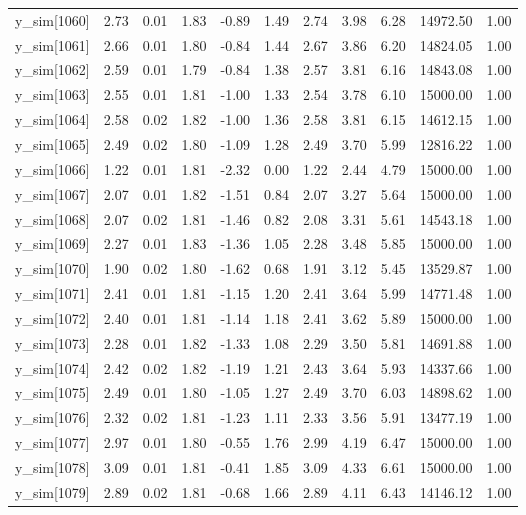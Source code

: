 \begin{table}[ht]
\begin{tabular}{rrrrrrrrrrr}
  y\_sim[1060] & 2.73 & 0.01 & 1.83 & -0.89 & 1.49 & 2.74 & 3.98 & 6.28 & 14972.50 & 1.00 \\ 
  y\_sim[1061] & 2.66 & 0.01 & 1.80 & -0.84 & 1.44 & 2.67 & 3.86 & 6.20 & 14824.05 & 1.00 \\ 
  y\_sim[1062] & 2.59 & 0.01 & 1.79 & -0.84 & 1.38 & 2.57 & 3.81 & 6.16 & 14843.08 & 1.00 \\ 
  y\_sim[1063] & 2.55 & 0.01 & 1.81 & -1.00 & 1.33 & 2.54 & 3.78 & 6.10 & 15000.00 & 1.00 \\ 
  y\_sim[1064] & 2.58 & 0.02 & 1.82 & -1.00 & 1.36 & 2.58 & 3.81 & 6.15 & 14612.15 & 1.00 \\ 
  y\_sim[1065] & 2.49 & 0.02 & 1.80 & -1.09 & 1.28 & 2.49 & 3.70 & 5.99 & 12816.22 & 1.00 \\ 
  y\_sim[1066] & 1.22 & 0.01 & 1.81 & -2.32 & 0.00 & 1.22 & 2.44 & 4.79 & 15000.00 & 1.00 \\ 
  y\_sim[1067] & 2.07 & 0.01 & 1.82 & -1.51 & 0.84 & 2.07 & 3.27 & 5.64 & 15000.00 & 1.00 \\ 
  y\_sim[1068] & 2.07 & 0.02 & 1.81 & -1.46 & 0.82 & 2.08 & 3.31 & 5.61 & 14543.18 & 1.00 \\ 
  y\_sim[1069] & 2.27 & 0.01 & 1.83 & -1.36 & 1.05 & 2.28 & 3.48 & 5.85 & 15000.00 & 1.00 \\ 
  y\_sim[1070] & 1.90 & 0.02 & 1.80 & -1.62 & 0.68 & 1.91 & 3.12 & 5.45 & 13529.87 & 1.00 \\ 
  y\_sim[1071] & 2.41 & 0.01 & 1.81 & -1.15 & 1.20 & 2.41 & 3.64 & 5.99 & 14771.48 & 1.00 \\ 
  y\_sim[1072] & 2.40 & 0.01 & 1.81 & -1.14 & 1.18 & 2.41 & 3.62 & 5.89 & 15000.00 & 1.00 \\ 
  y\_sim[1073] & 2.28 & 0.01 & 1.82 & -1.33 & 1.08 & 2.29 & 3.50 & 5.81 & 14691.88 & 1.00 \\ 
  y\_sim[1074] & 2.42 & 0.02 & 1.82 & -1.19 & 1.21 & 2.43 & 3.64 & 5.93 & 14337.66 & 1.00 \\ 
  y\_sim[1075] & 2.49 & 0.01 & 1.80 & -1.05 & 1.27 & 2.49 & 3.70 & 6.03 & 14898.62 & 1.00 \\ 
  y\_sim[1076] & 2.32 & 0.02 & 1.81 & -1.23 & 1.11 & 2.33 & 3.56 & 5.91 & 13477.19 & 1.00 \\ 
  y\_sim[1077] & 2.97 & 0.01 & 1.80 & -0.55 & 1.76 & 2.99 & 4.19 & 6.47 & 15000.00 & 1.00 \\ 
  y\_sim[1078] & 3.09 & 0.01 & 1.81 & -0.41 & 1.85 & 3.09 & 4.33 & 6.61 & 15000.00 & 1.00 \\ 
  y\_sim[1079] & 2.89 & 0.02 & 1.81 & -0.68 & 1.66 & 2.89 & 4.11 & 6.43 & 14146.12 & 1.00 \\ 

\end{tabular}
\end{table}
